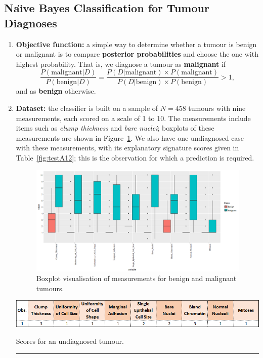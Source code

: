 \subsection{Na\"{\i}ve Bayes Classification for Tumour Diagnoses}
\begin{enumerate}[noitemsep]
    \item \textbf{Objective function:} a simple way to determine whether a tumour is benign or malignant is to compare \textbf{posterior probabilities} and choose the one with highest probability. That is, we diagnose a tumour as \textbf{malignant} if 
        \begin{equation*}
        \frac{P(\textrm{malignant}|D)}{P(\textrm{benign}|D)}=\frac{P(D|\textrm{malignant})\times P(\textrm{malignant})}{P(D|\textrm{benign})\times P(\textrm{benign})}>1,
    \end{equation*}
    and as \textbf{benign} otherwise. 
    
    \item \textbf{Dataset:} the classifier is built on a sample of $N=458$ tumours with nine measurements, each scored on a scale of 1 to 10. The measurements include items such as \textit{clump thickness} and \textit{bare nuclei}; boxplots of these measurements are shown in Figure~\ref{fig:testA10}. We also have one undiagnosed case with these measurements, with its explanatory signature scores given in Table~\ref{fig:testA12}; this is the observation for which a prediction is required.    
    \begin{figure}[!t]
    \centering
      \includegraphics[width=\textwidth]{Images/testA10.png}
      \caption[\small Visualisation of tumour measurements]{\small Boxplot visualisation of measurements for benign and malignant tumours.}
      \label{fig:testA10}
    \end{figure}
    
    \begin{table}[!t]
    \centering
      \includegraphics[width=\textwidth]{Images/testA12.png}
      \caption[\small Scores for an undiagnosed tumour]{Scores for an undiagnosed tumour.}
      \label{fig:testA12}\hrule
    \end{table}


\end{enumerate}
